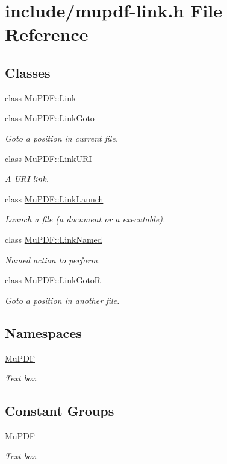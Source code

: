 \hypertarget{mupdf-link_8h}{\section{include/mupdf-\/link.h File Reference}
\label{mupdf-link_8h}
}
\subsection*{Classes}
\begin{DoxyCompactItemize}
\item 
class \hyperlink{class_mu_p_d_f_1_1_link}{Mu\-P\-D\-F\-::\-Link}
\item 
class \hyperlink{class_mu_p_d_f_1_1_link_goto}{Mu\-P\-D\-F\-::\-Link\-Goto}
\begin{DoxyCompactList}\small\item\em Goto a position in current file. \end{DoxyCompactList}\item 
class \hyperlink{class_mu_p_d_f_1_1_link_u_r_i}{Mu\-P\-D\-F\-::\-Link\-U\-R\-I}
\begin{DoxyCompactList}\small\item\em A U\-R\-I link. \end{DoxyCompactList}\item 
class \hyperlink{class_mu_p_d_f_1_1_link_launch}{Mu\-P\-D\-F\-::\-Link\-Launch}
\begin{DoxyCompactList}\small\item\em Launch a file (a document or a executable). \end{DoxyCompactList}\item 
class \hyperlink{class_mu_p_d_f_1_1_link_named}{Mu\-P\-D\-F\-::\-Link\-Named}
\begin{DoxyCompactList}\small\item\em Named action to perform. \end{DoxyCompactList}\item 
class \hyperlink{class_mu_p_d_f_1_1_link_goto_r}{Mu\-P\-D\-F\-::\-Link\-Goto\-R}
\begin{DoxyCompactList}\small\item\em Goto a position in another file. \end{DoxyCompactList}\end{DoxyCompactItemize}
\subsection*{Namespaces}
\begin{DoxyCompactItemize}
\item 
\hyperlink{namespace_mu_p_d_f}{Mu\-P\-D\-F}
\begin{DoxyCompactList}\small\item\em Text box. \end{DoxyCompactList}\end{DoxyCompactItemize}
\subsection*{Constant Groups}
\begin{DoxyCompactItemize}
\item 
\hyperlink{namespace_mu_p_d_f}{Mu\-P\-D\-F}
\begin{DoxyCompactList}\small\item\em Text box. \end{DoxyCompactList}\end{DoxyCompactItemize}
